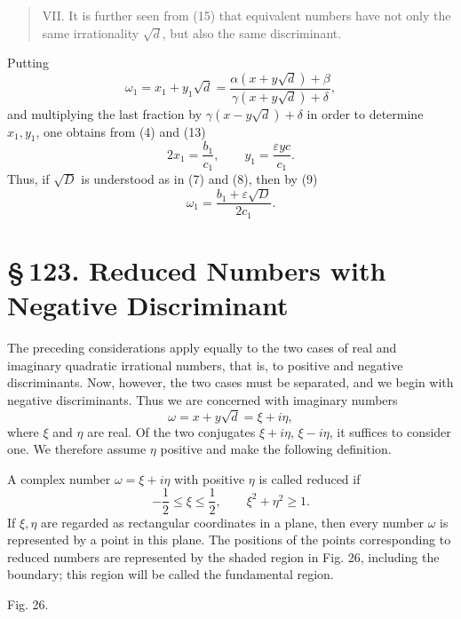 \documentclass[11pt]{article}
\providecommand{\sect}[2]{\section*{\S\,#1. #2}}
\begin{document}
\begin{quote}
VII. It is further seen from (15) that equivalent numbers have not only the same irrationality $\sqrt d$, but also the same discriminant.
\end{quote}

Putting
\[
\tag{16}       \omega_1=x_1+y_1\sqrt d
       =\frac{\alpha(x+y\sqrt d)+\beta}{\gamma(x+y\sqrt d)+\delta},
\]
and multiplying the last fraction by $\gamma(x-y\sqrt d)+\delta$ in order to determine $x_1,y_1$, one obtains from (4) and (13)
\[
\tag{17}       2x_1=\frac{b_1}{c_1},
       \qquad
       y_1=\frac{\varepsilon yc}{c_1}.
\]
Thus, if $\sqrt D$ is understood as in (7) and (8), then by (9)
\[
\tag{18}       \omega_1=\frac{b_1+\varepsilon\sqrt D}{2c_1}.
\]

\sect{123}{Reduced Numbers with Negative Discriminant}

The preceding considerations apply equally to the two cases of real and imaginary quadratic irrational numbers, that is, to positive and negative discriminants. Now, however, the two cases must be separated, and we begin with negative discriminants. Thus we are concerned with imaginary numbers
\[
\tag{1}        \omega=x+y\sqrt d=\xi+i\eta,
\]
where $\xi$ and $\eta$ are real. Of the two conjugates $\xi+i\eta$, $\xi-i\eta$, it suffices to consider one. We therefore assume $\eta$ positive and make the following definition.

A complex number $\omega=\xi+i\eta$ with positive $\eta$ is called reduced if
\[
\tag{2}        -\frac12\le \xi\le \frac12,
        \qquad
        \xi^2+\eta^2\ge1.
\]
If $\xi,\eta$ are regarded as rectangular coordinates in a plane, then every number $\omega$ is represented by a point in this plane. The positions of the points corresponding to reduced numbers are represented by the shaded region in Fig. 26, including the boundary; this region will be called the fundamental region.

\begin{center}

{\small Fig. 26.}
\end{center}
\end{document}
